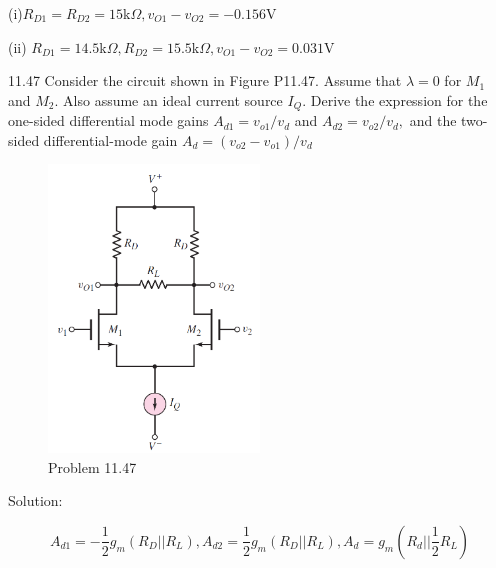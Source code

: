 \documentclass[a4paper,11pt,UTF8]{article}
\begin{document}
(i)$ R_{D1}=R_{D2}=15$k$\Omega,v_{O1}-v_{O2}=-0.156$V 

(ii) $R_{D1}= 14.5$k$\Omega, R_{D2}= 15.5$k$\Omega,v_{O1}-v_{O2}=0.031$V

11.47  Consider the circuit shown in Figure P11.47. Assume that $\lambda=0$ for $M_{1}$ and $M_{2}$. Also assume an ideal current source $I_{Q}$. Derive the expression for the one-sided differential mode gains  $A_{d1}= v_{o1}/v_d$ and $A_{d2}= v_{o2}/v_d, $ and the two-sided differential-mode gain $A_d=(v_{o2}-v_{o1})/v_d$ 
\begin{figure}[H]
	\centering
	\includegraphics[width=0.5\textwidth]{11.47}
	\caption{Problem 11.47}
\end{figure}
\noindent Solution:

$$A_{d1}=-\frac12g_m(R_D||R_L),A_{d2}=\frac12g_m(R_D||R_L),A_d=g_m(R_d||\frac12R_L)$$
\end{document}

